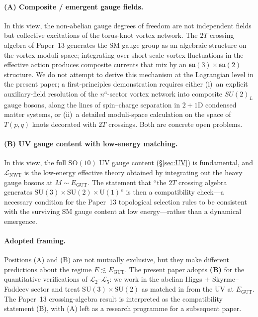 \documentclass[11pt]{article}
\newcommand{\Lnwt}{\mathcal{L}_\text{NWT}}
\begin{document}
\paragraph{(A) Composite / emergent gauge fields.}
In this view, the non-abelian gauge degrees of freedom are not
independent fields but collective excitations of the torus-knot
vortex network.  The $2T$ crossing algebra of Paper~13 generates
the SM gauge group as an algebraic structure on the vortex moduli
space; integrating over short-scale vortex fluctuations in the
effective action produces composite currents that mix by an
$\mathfrak{su}(3) \times \mathfrak{su}(2)$ structure.  We do not
attempt to derive this mechanism at the Lagrangian level in the
present paper; a first-principles demonstration requires either
(i)~an explicit auxiliary-field resolution of the $n^a$-sector
vortex network into composite $SU(2)_L$ gauge bosons, along the
lines of spin--charge separation in $2+1$D condensed matter
systems, or (ii)~a detailed moduli-space calculation on the space
of $T(p, q)$ knots decorated with $2T$ crossings.  Both are
concrete open problems.

\paragraph{(B) UV gauge content with low-energy matching.}
In this view, the full $\mathrm{SO}(10)$ UV gauge content
(\S\ref{sec:UV}) is fundamental, and $\Lnwt$ is the low-energy
effective theory obtained by integrating out the heavy gauge bosons
at $M \sim E_\text{GUT}$.  The statement that ``the $2T$ crossing
algebra generates $\mathrm{SU}(3) \times \mathrm{SU}(2) \times
\mathrm{U}(1)$'' is then a compatibility check---a necessary
condition for the Paper~13 topological selection rules to be
consistent with the surviving SM gauge content at low energy---rather
than a dynamical emergence.

\paragraph{Adopted framing.}
Positions (A) and (B) are not mutually exclusive, but they make
different predictions about the regime $E \lesssim E_\text{GUT}$.
The present paper adopts \textbf{(B)} for the quantitative
verifications of $\mathcal{L}_2$--$\mathcal{L}_5$: we work in the
abelian Higgs $+$ Skyrme--Faddeev sector and treat
$\mathrm{SU}(3) \times \mathrm{SU}(2)$ as matched in from the UV at
$E_\text{GUT}$.  The Paper~13 crossing-algebra result is interpreted
as the compatibility statement (B), with (A) left as a research
programme for a subsequent paper.
\end{document}
